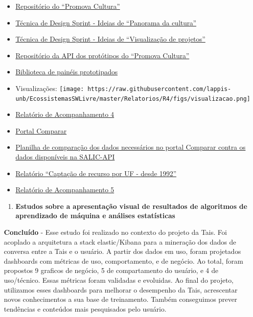 \begin{itemize}
\tightlist
\item
  \href{https://github.com/lappis-unb/PromovaCultura/}{Repositório do
  ``Promova Cultura''}
\item
  \href{https://github.com/lappis-unb/PromovaCultura/wiki/Design-Sprints-Panorama}{Técnica
  de Design Sprint - Ideias de ``Panorama da cultura''}
\item
  \href{https://github.com/lappis-unb/PromovaCultura/wiki/Design-Sprints-Visualizacao}{Técnica
  de Design Sprint - Ideias de ``Visualização de projetos''}
\item
  \href{https://github.com/lappis-unb/PromovaCultura/}{Repositório da
  API dos protótipos do ``Promova Cultura''}
\item
  \href{https://lappis-unb.github.io/PromovaCultura/}{Biblioteca de
  painéis prototipados}
\item
  Visualizações:
  \texttt{[image: https://raw.githubusercontent.com/lappis-unb/EcossistemasSWLivre/master/Relatorios/R4/figs/visualizacao.png]}
\item
  \href{https://github.com/lappis-unb/EcossistemasSWLivre/tree/master/Relatorios/R4}{Relatório
  de Acompanhamento 4}
\item
  \href{http://sistemas.cultura.gov.br/comparar/salicnet/salicnet.php}{Portal
  Comparar}
\item
  \href{https://docs.google.com/spreadsheets/d/1HjrNITQ8EGYVrMCxTMUh14Ogyaxum5WVYP4jVDwki4o/edit\#gid=1949184657}{Planilha
  de comparação dos dados necessários no portal Comparar contra os dados
  disponíveis na SALIC-API}
\item
  \href{http://sistemas.cultura.gov.br/comparar/grid_Proponente_Captacao_UF/grid_Proponente_Captacao_UF.php}{Relatório
  ``Captação de recurso por UF - desde 1992''}
\item
  \href{https://github.com/lappis-unb/EcossistemasSWLivre/tree/master/Relatorios/R5}{Relatório
  de Acompanhamento 5}
\end{itemize}

\begin{enumerate}
\def\labelenumi{\arabic{enumi}.}
\setcounter{enumi}{1}
\tightlist
\item
  \textbf{Estudos sobre a apresentação visual de resultados de
  algoritmos de aprendizado de máquina e análises estatísticas}
\end{enumerate}

\textbf{Concluído} - Esse estudo foi realizado no contexto do projeto da
Tais. Foi acoplado a arquitetura a stack elastic/Kibana para a mineração
dos dados de conversa entre a Tais e o usuário. A partir dos dados em
uso, foram projetados dashboards com métricas de uso, comportamento, e
de negócio. Ao total, foram propostos 9 graficos de negócio, 5 de
compartamento do usuário, e 4 de uso/técnico. Essas métricas foram
validadas e evoluidas. Ao final do projeto, utilizamos esses dashboards
para melhorar o desempenho da Tais, acrescentar novos conhecimentos a
sua base de treinamento. Também conseguimos prever tendências e
conteúdos mais pesquisados pelo usuário.


